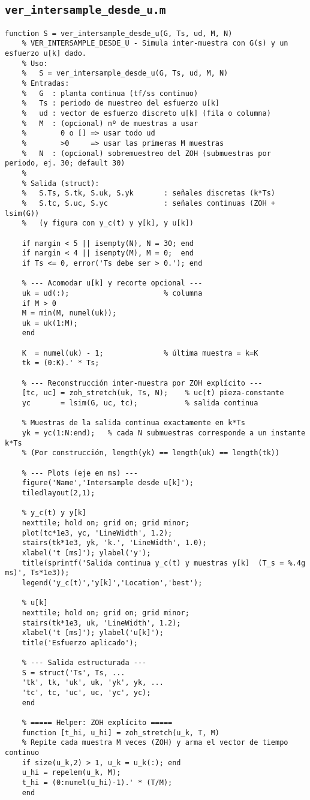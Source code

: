 \subsection{\texttt{ver\_intersample\_desde\_u.m}}
\begin{lstlisting}[style=matlabstyle,caption={Reconstrucción inter-muestra desde $u[k]$.}]
	function S = ver_intersample_desde_u(G, Ts, ud, M, N)
	% VER_INTERSAMPLE_DESDE_U - Simula inter-muestra con G(s) y un esfuerzo u[k] dado.
	% Uso:
	%   S = ver_intersample_desde_u(G, Ts, ud, M, N)
	% Entradas:
	%   G  : planta continua (tf/ss continuo)
	%   Ts : periodo de muestreo del esfuerzo u[k]
	%   ud : vector de esfuerzo discreto u[k] (fila o columna)
	%   M  : (opcional) nº de muestras a usar
	%        0 o [] => usar todo ud
	%        >0     => usar las primeras M muestras
	%   N  : (opcional) sobremuestreo del ZOH (submuestras por periodo, ej. 30; default 30)
	%
	% Salida (struct):
	%   S.Ts, S.tk, S.uk, S.yk       : señales discretas (k*Ts)
	%   S.tc, S.uc, S.yc             : señales continuas (ZOH + lsim(G))
	%   (y figura con y_c(t) y y[k], y u[k])
	
	if nargin < 5 || isempty(N), N = 30; end
	if nargin < 4 || isempty(M), M = 0;  end
	if Ts <= 0, error('Ts debe ser > 0.'); end
	
	% --- Acomodar u[k] y recorte opcional ---
	uk = ud(:);                      % columna
	if M > 0
	M = min(M, numel(uk));
	uk = uk(1:M);
	end
	
	K  = numel(uk) - 1;              % última muestra = k=K
	tk = (0:K).' * Ts;
	
	% --- Reconstrucción inter-muestra por ZOH explícito ---
	[tc, uc] = zoh_stretch(uk, Ts, N);    % uc(t) pieza-constante
	yc       = lsim(G, uc, tc);           % salida continua
	
	% Muestras de la salida continua exactamente en k*Ts
	yk = yc(1:N:end);   % cada N submuestras corresponde a un instante k*Ts
	% (Por construcción, length(yk) == length(uk) == length(tk))
	
	% --- Plots (eje en ms) ---
	figure('Name','Intersample desde u[k]');
	tiledlayout(2,1);
	
	% y_c(t) y y[k]
	nexttile; hold on; grid on; grid minor;
	plot(tc*1e3, yc, 'LineWidth', 1.2);
	stairs(tk*1e3, yk, 'k.', 'LineWidth', 1.0);
	xlabel('t [ms]'); ylabel('y');
	title(sprintf('Salida continua y_c(t) y muestras y[k]  (T_s = %.4g ms)', Ts*1e3));
	legend('y_c(t)','y[k]','Location','best');
	
	% u[k]
	nexttile; hold on; grid on; grid minor;
	stairs(tk*1e3, uk, 'LineWidth', 1.2);
	xlabel('t [ms]'); ylabel('u[k]');
	title('Esfuerzo aplicado');
	
	% --- Salida estructurada ---
	S = struct('Ts', Ts, ...
	'tk', tk, 'uk', uk, 'yk', yk, ...
	'tc', tc, 'uc', uc, 'yc', yc);
	end
	
	% ===== Helper: ZOH explícito =====
	function [t_hi, u_hi] = zoh_stretch(u_k, T, M)
	% Repite cada muestra M veces (ZOH) y arma el vector de tiempo continuo
	if size(u_k,2) > 1, u_k = u_k(:); end
	u_hi = repelem(u_k, M);
	t_hi = (0:numel(u_hi)-1).' * (T/M);
	end
	
	
	
\end{lstlisting}

